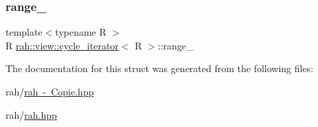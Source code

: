 \mbox{\label{structrah_1_1view_1_1cycle__iterator_ad82f54467048a95f8e8f05e5a78afb48}} 
\subsubsection{\texorpdfstring{range\_}{range\_}}
{\footnotesize\ttfamily template$<$typename R $>$ \\
R \mbox{\hyperlink{structrah_1_1view_1_1cycle__iterator}{rah\+::view\+::cycle\+\_\+iterator}}$<$ R $>$\+::range\+\_\+}



The documentation for this struct was generated from the following files\+:\begin{DoxyCompactItemize}
\item 
rah/\mbox{\hyperlink{rah_01-_01_copie_8hpp}{rah -\/ Copie.\+hpp}}\item 
rah/\mbox{\hyperlink{rah_8hpp}{rah.\+hpp}}\end{DoxyCompactItemize}
